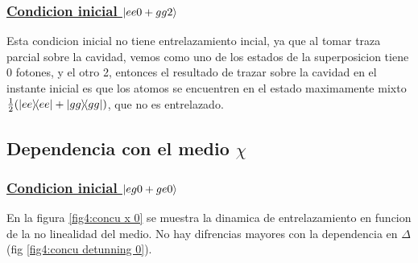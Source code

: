 \subsubsection{\underline{Condicion inicial $\ket{ee0+gg2}$}}
Esta condicion inicial no tiene entrelazamiento incial, ya que al tomar traza parcial sobre la cavidad, vemos como uno de los estados de la superposicion tiene 0 fotones, y el otro 2, entonces el resultado de trazar sobre la cavidad en el instante inicial es que los atomos se encuentren en el estado maximamente mixto $\frac{1}{2}(\ketbra{ee}{ee}+\ketbra{gg}{gg})$, que no es entrelazado.

\subsection{Dependencia con el medio $\chi$}
\subsubsection{\underline{Condicion inicial $\ket{eg0+ge0}$}}
En la figura \ref{fig4:concu x 0} se muestra la dinamica de entrelazamiento en funcion de la no linealidad del medio. No hay difrencias mayores con la dependencia en $\Delta$ (fig \ref{fig4:concu detunning 0}).
